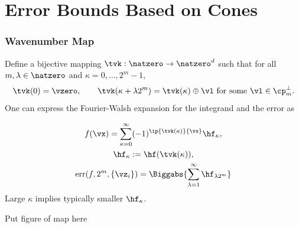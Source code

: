 \documentclass[10pt,compress]{beamer} %
\DeclareMathOperator{\err}{err}
\newcommand{\desall}{\{\vz_i\}}
\begin{document}
\section{Error Bounds Based on Cones}
\begin{frame}\frametitle{Wavenumber Map}
Define a bijective  mapping $\tvk:\natzero \to \natzero^d$ such that for all $m,\lambda \in \natzero$ and $\kappa=0, \ldots, 2^m-1$,
\[
\tvk(0) = \vzero, \qquad \tvk(\kappa+\lambda 2^m)=\tvk(\kappa) \oplus \vl \text{ for some }\vl \in \cp_m^{\perp}.
\]
One can express the Fourier-Walsh expansion for the integrand and the error as
\begin{minipage}{6cm}
\begin{gather*}
f(\vx) = \sum_{\kappa=0}^{\infty} (-1)^{\ip{\tvk(\kappa)}{\vx}} \hf_{\kappa}, \\
\hf_{\kappa}:=\hf(\tvk(\kappa)), \\
\err(f,2^m,\desall) = \Biggabs{\sum_{\lambda=1}^{\infty} \hf_{\lambda 2^m}}
\end{gather*}
\alert{Large $\kappa$ implies typically smaller $\hf_{\kappa}$.}
\end{minipage}
\begin{minipage}{5.5cm}
Put figure of map here
\end{minipage}
\end{frame}
\end{document}

